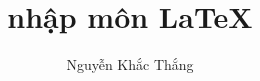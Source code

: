 \documentclass[12pt,a4paper,twoside]{article}
\begin{document}
\author{Nguyễn Khắc Thắng}
\title{nhập môn \LaTeX}
\end{document}
